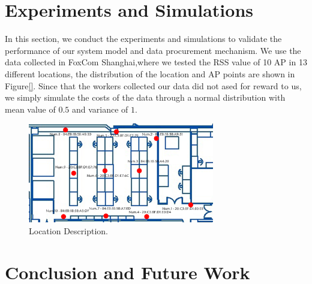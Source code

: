 \documentclass[10pt,conference,compsocconf,letterpaper]{IEEEtran}
\begin{document}
\section{Experiments and Simulations}\label{exp&sim}
In this section, we conduct the experiments and simulations to validate the performance of our system model and data procurement mechanism. We use the data collected in FoxCom Shanghai,where we tested the RSS value of 10 AP in 13 different locations, the distribution of the location and AP points are shown in Figure\ref{}. Since that the workers collected our data did not ased for reward to us, we simply simulate the costs of the data through a normal distribution with mean value of $0.5$ and variance of $1$.
\begin{figure}[htbp]
\centering
\includegraphics[width =230pt ,keepaspectratio ]{exp-loc.png}
\caption{Location Description.}
\label{fig:exp-loc}
\end{figure}

\section{Conclusion and Future Work}\label{concandfuture}





%
\end{document}
